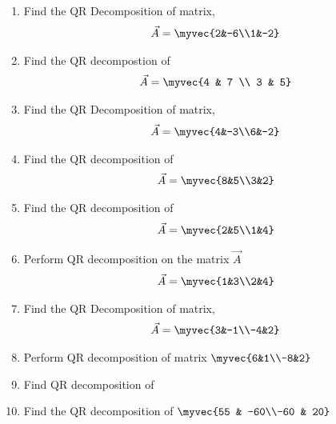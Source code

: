\begin{enumerate}[label=\thesubsection.\arabic*.,ref=\thesubsection.\theenumi]
\solution

\item Find the QR Decomposition of matrix,
\begin{align}
\vec{A} = \myvec{2&-6\\1&-2}
\label{eq:solutions/2/26/Q}
\end{align}
\solution

%
\item Find the QR decompostion of 
\begin{align} 
    \vec{A} = \myvec{4 & 7 \\ 3 & 5}
\end{align}
%
\solution

\item Find the QR Decomposition of matrix,
\begin{align}
\vec{A} = \myvec{4&-3\\6&-2}
\label{eq:solutions/2/28/Q}
\end{align}
%
\solution

\item Find the QR decomposition of 
\begin{align}
\vec{A}=\myvec{8&5\\3&2} \label{eq:solutions/2/29/eq:1}
\end{align}
%
%
\item Find the QR decomposition of 
\begin{align}
\vec{A}=\myvec{2&5\\1&4} \label{eq:solutions/2/30/1}
\end{align}

\solution

%
\item Perform QR decomposition on the matrix $\vec{A}$ 
\begin{align}
\vec{A}=\myvec{1&3\\2&4} \label{eq:solutions/2/31/eq:1}
\end{align}
%
\solution

%
\item Find the QR Decomposition of matrix,
\begin{align}
\vec{A} = \myvec{3&-1\\-4&2}
\label{eq:solutions/2/32/eq:p0}
\end{align}
%
\solution

\item Perform QR decomposition of matrix $\myvec{6&1\\-8&2}$
\solution

\item Find QR decomposition of 
%
\solution

%
\item Find the QR decomposition of $\myvec{55 & -60\\-60 & 20}$


\end{enumerate}
